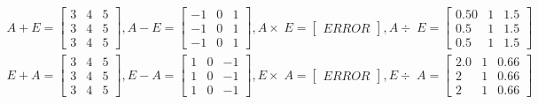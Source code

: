 \documentclass[UTF8,a4paper,notitlepage,openany,plain,final]{ctexbook}
\begin{document}
    \[ \begin{split}
        A + E =
        \begin{bmatrix}
            3 & 4 & 5 \\
            3 & 4 & 5 \\
            3 & 4 & 5
        \end{bmatrix}
        , A - E =
        \begin{bmatrix}
            -1 & 0 & 1 \\
            -1 & 0 & 1 \\
            -1 & 0 & 1
        \end{bmatrix}
        , A \times\; E =
        \begin{bmatrix}
            ERROR
        \end{bmatrix}
        , A \div\; E =
        \begin{bmatrix}
            0.50 & 1 & 1.5 \\
            0.5  & 1 & 1.5 \\
            0.5  & 1 & 1.5
        \end{bmatrix}
        \\
        E + A =
        \begin{bmatrix}
            3 & 4 & 5 \\
            3 & 4 & 5 \\
            3 & 4 & 5
        \end{bmatrix}
        , E - A =
        \begin{bmatrix}
            1 & 0 & -1 \\
            1 & 0 & -1 \\
            1 & 0 & -1
        \end{bmatrix}
        , E \times\; A =
        \begin{bmatrix}
            ERROR
        \end{bmatrix}
        , E \div\; A =
        \begin{bmatrix}
            2.0 & 1 & 0.66 \\
            2   & 1 & 0.66 \\
            2   & 1 & 0.66
        \end{bmatrix}
    \end{split} \]
\end{document}

